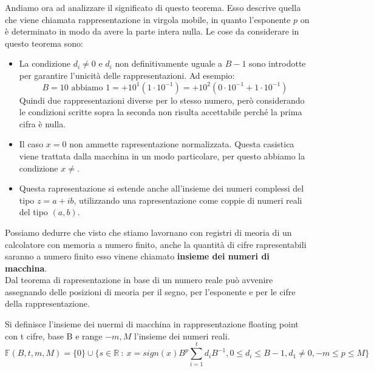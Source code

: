 \hspace{-15pt}Andiamo ora ad analizzare il significato di questo teorema. Esso descrive quella che viene chiamata rappresentazione
in virgola mobile, in quanto l'esponente \(p\) on è determinato in modo da avere la parte intera nulla. Le cose da considerare
in questo teorema sono:
\begin{itemize}
    \item La condizione \(d_i \neq 0\) e \(d_i\) non definitivamente uguale a \(B - 1\) sono introdotte per garantire
    l'unicità delle rappresentazioni. Ad esempio:
    \[B = 10 \text{ abbiamo } 1 = +10^1 (1 \cdot 10^{-1}) = +10^2 (0 \cdot 10^{-1} + 1 \cdot 10^{-1})\]
    Quindi due rappresentazioni diverse per lo stesso numero, però considerando le condizioni scritte sopra la seconda non risulta
    accettabile perché la prima cifra è nulla.
    \item Il caso \(x=0\) non ammette rapresentazione normalizzata. Questa casistica viene trattata dalla macchina in un modo
    particolare, per questo abbiamo la condizione \(x\neq \).
    \item Questa rapresentazione si estende anche all'insieme dei numeri complessi del tipo \(z = a + ib\), utilizzando una rapresentazione
    come coppie di numeri reali del tipo \((a,b)\).
\end{itemize}

Possiamo dedurre che visto che stiamo lavornano con registri di meoria di un calcolatore con memoria a numero finito, anche la quantità
di cifre rapresentabili saranno a numero finito esso vinene chiamato \textbf{insieme dei numeri di macchina}.\\

Dal teorema di rapresentazione in base di un numero reale può avvenire assegnando delle posizioni di meoria per il segno, 
per l'esponente e per le cifre della rappresentazione.

\begin{definition}
    Si definisce l'insieme dei nuermi di macchina in rappresentazione floating point con t cifre, base B e range \(-m, M\) l'insieme dei numeri reali.
    \[\mathbb{F}(B, t, m, M) = \{0\} \cup \{s \in \mathbb{R} \::\: x = sign(x) B^p \sum_{i=1}^{t} d_i B^{-1}, 0\leq d_i \leq B - 1, d_1 \neq 0, -m \leq p \leq M\}\]
\end{definition}

